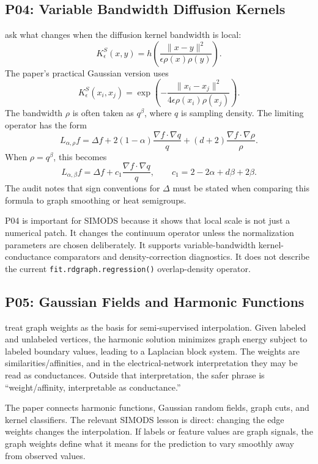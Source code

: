 \documentclass[11pt]{article}
\newcommand{\code}[1]{\texttt{#1}}
\begin{document}
\subsection{P04: Variable Bandwidth Diffusion Kernels}

\citet{berry2016variable} ask what changes when the diffusion kernel bandwidth
is local:
\[
  K_\epsilon^S(x,y)
  =
  h\!\left(
    \frac{\|x-y\|^2}{\epsilon\rho(x)\rho(y)}
  \right).
\]
The paper's practical Gaussian version uses
\[
  K_\epsilon^S(x_i,x_j)
  =
  \exp\left(
    -\frac{\|x_i-x_j\|^2}
          {4\epsilon\rho(x_i)\rho(x_j)}
  \right).
\]
The bandwidth \(\rho\) is often taken as \(q^\beta\), where \(q\) is sampling
density.  The limiting operator has the form
\[
  L_{\alpha,\rho}f
  =
  \Delta f
  +2(1-\alpha)\frac{\nabla f\cdot\nabla q}{q}
  +(d+2)\frac{\nabla f\cdot\nabla\rho}{\rho}.
\]
When \(\rho=q^\beta\), this becomes
\[
  L_{\alpha,\beta}f
  =
  \Delta f+
  c_1\frac{\nabla f\cdot\nabla q}{q},
  \qquad
  c_1=2-2\alpha+d\beta+2\beta.
\]
The audit notes that sign conventions for \(\Delta\) must be stated when
comparing this formula to graph smoothing or heat semigroups.

P04 is important for SIMODS because it shows that local scale is not just a
numerical patch.  It changes the continuum operator unless the normalization
parameters are chosen deliberately.  It supports variable-bandwidth
kernel-conductance comparators and density-correction diagnostics.  It does
not describe the current \code{fit.rdgraph.regression()} overlap-density
operator.

\subsection{P05: Gaussian Fields and Harmonic Functions}

\citet{zhu2003semisupervised} treat graph weights as the basis for
semi-supervised interpolation.  Given labeled and unlabeled vertices, the
harmonic solution minimizes graph energy subject to labeled boundary values,
leading to a Laplacian block system.  The weights are similarities/affinities,
and in the electrical-network interpretation they may be read as conductances.
Outside that interpretation, the safer phrase is ``weight/affinity,
interpretable as conductance.''

The paper connects harmonic functions, Gaussian random fields, graph cuts, and
kernel classifiers.  The relevant SIMODS lesson is direct: changing the edge
weights changes the interpolation.  If labels or feature values are graph
signals, the graph weights define what it means for the prediction to vary
smoothly away from observed values.
\end{document}
